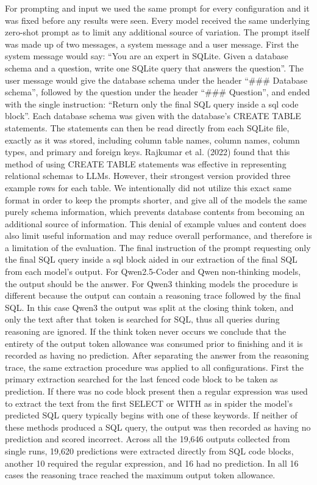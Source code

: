 For prompting and input we used the same prompt for every configuration and it was fixed before any results were seen. Every model received the same underlying zero-shot prompt as to limit any additional source of variation. The prompt itself was made up of two messages, a system message and a user message. First the system message would say: ``You are an expert in SQLite. Given a database schema and a question, write one SQLite query that answers the question''. The user message would give the database schema under the header ``\#\#\# Database schema'', followed by the question under the header ``\#\#\# Question'', and ended with the single instruction: ``Return only the final SQL query inside a sql code block''. Each database schema was given with the database's CREATE TABLE statements. The statements can then be read directly from each SQLite file, exactly as it was stored, including column table names, column names, column types, and primary and foreign keys. Rajkumar et al. (2022) found that this method of using CREATE TABLE statements was effective in representing relational schemas to LLMs. However, their strongest version provided three example rows for each table. We intentionally did not utilize this exact same format in order to keep the prompts shorter, and give all of the models the same purely schema information, which prevents database contents from becoming an additional source of information. This denial of example values and content does also limit useful information and may reduce overall performance, and therefore is a limitation of the evaluation. The final instruction of the prompt requesting only the final SQL query inside a sql block aided in our extraction of the final SQL from each model's output. For Qwen2.5-Coder and Qwen non-thinking models, the output should be the answer. For Qwen3 thinking models the procedure is different because the output can contain a reasoning trace followed by the final SQL. In this case Qwen3 the output was split at the closing think token, and only the text after that token is searched for SQL, thus all queries during reasoning are ignored. If the think token never occurs we conclude that the entirety of the output token allowance was consumed prior to finishing and it is recorded as having no prediction. After separating the answer from the reasoning trace, the same extraction procedure was applied to all configurations. First the primary extraction searched for the last fenced code block to be taken as prediction. If there was no code block present then a regular expression was used to extract the text from the first SELECT or WITH as in spider the model's predicted SQL query typically begins with one of these keywords. If neither of these methods produced a SQL query, the output was then recorded as having no prediction and scored incorrect. Across all the 19,646 outputs collected from single runs, 19,620 predictions were extracted directly from SQL code blocks, another 10 required the regular expression, and 16 had no prediction. In all 16 cases the reasoning trace reached the maximum output token allowance.


